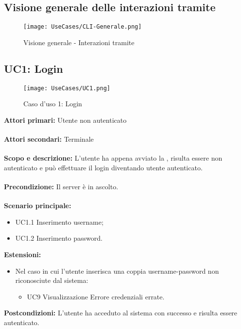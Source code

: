 \documentclass{scalatekids-article}
\begin{document}
\subsection{Visione generale delle interazioni tramite }
\begin{figure}[H]
  \begin{center}
    \texttt{[image: UseCases/CLI-Generale.png]}
    \caption*{Visione generale - Interazioni tramite }
  \end{center}
\end{figure}

\subsection{UC1: Login}

\begin{figure}[H]
  \begin{center}
    \texttt{[image: UseCases/UC1.png]}
    \caption*{Caso d'uso 1: Login}
  \end{center}
\end{figure}
\textbf{Attori primari:} Utente non autenticato\\ \\
\textbf{Attori secondari:} Terminale\\ \\
\textbf{Scopo e descrizione:}
L’utente ha appena avviato la , risulta essere non autenticato e può effettuare il login diventando utente
autenticato.\\ \\
\textbf{Precondizione:} Il server è in ascolto.\\ \\
\textbf{Scenario principale:}
\begin{itemize}
\item UC1.1 Inserimento username;
\item UC1.2 Inserimento password.
\end{itemize}
\textbf{Estensioni:}
\begin{itemize}
\item Nel caso in cui l'utente inserisca una coppia username-password non riconosciute dal sistema:
  \begin{itemize}
  \item UC9 Visualizzazione Errore credenziali errate.
  \end{itemize}
\end{itemize}
\textbf{Postcondizioni:} L'utente ha acceduto al sistema con successo e risulta essere autenticato.
\end{document}
